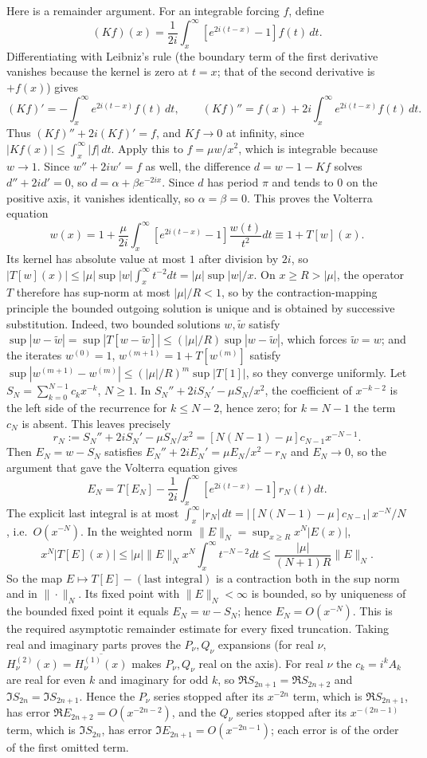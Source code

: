 Here is a remainder argument. For an integrable forcing $f$, define
\[
(Kf)(x)=\frac1{2i}\int_x^\infty[e^{2i(t-x)}-1]f(t)\,dt.
\]
Differentiating with Leibniz's rule (the boundary term of the first
derivative vanishes because the kernel is zero at $t=x$; that of the
second derivative is $+f(x)$) gives
\[
(Kf)'=-\int_x^\infty e^{2i(t-x)}f(t)\,dt,\qquad
(Kf)''=f(x)+2i\int_x^\infty e^{2i(t-x)}f(t)\,dt.
\]
Thus $(Kf)''+2i(Kf)'=f$, and $Kf\to0$ at infinity, since
$|Kf(x)|\le\int_x^\infty|f|\,dt$.
Apply this to $f=\mu w/x^2$, which is integrable because $w\to1$.
Since $w''+2iw'=f$ as well, the difference $d=w-1-Kf$ solves
$d''+2id'=0$, so $d=\alpha+\beta e^{-2ix}$.
Since $d$ has period $\pi$ and tends to $0$ on the positive axis, it
vanishes identically, so $\alpha=\beta=0$.
This proves the Volterra equation
\[
w(x)=1+\frac\mu{2i}\int_x^\infty
 [e^{2i(t-x)}-1]\frac{w(t)}{t^2}dt\equiv1+T[w](x).
\]
Its kernel has absolute value at most $1$ after division by $2i$, so
$|T[w](x)|\le|\mu|\sup|w|\int_x^\infty t^{-2}dt=|\mu|\sup|w|/x$.
On $x\ge R>|\mu|$, the operator $T$ therefore has sup-norm at most
$|\mu|/R<1$, so by the contraction-mapping principle the bounded
outgoing solution is unique and is obtained by successive substitution.
Indeed, two bounded solutions $w,\tilde w$ satisfy
$\sup|w-\tilde w|=\sup|T[w-\tilde w]|\le(|\mu|/R)\sup|w-\tilde w|$,
which forces $\tilde w=w$; and the iterates $w^{(0)}=1$,
$w^{(m+1)}=1+T[w^{(m)}]$ satisfy
$\sup|w^{(m+1)}-w^{(m)}|\le(|\mu|/R)^m\sup|T[1]|$, so they converge
uniformly. Let $S_N=\sum_{k=0}^{N-1}c_kx^{-k}$, $N\ge1$.
In $S_N''+2iS_N'-\mu S_N/x^2$, the coefficient of $x^{-k-2}$ is the
left side of the recurrence for $k\le N-2$, hence zero; for $k=N-1$
the term $c_N$ is absent. This leaves precisely
\[
r_N:=S_N''+2iS_N'-\mu S_N/x^2
=[N(N-1)-\mu]c_{N-1}x^{-N-1}.
\]
Then $E_N=w-S_N$ satisfies $E_N''+2iE_N'=\mu E_N/x^2-r_N$ and
$E_N\to0$, so the argument that gave the Volterra equation gives
\[
E_N=T[E_N]-\frac1{2i}\int_x^\infty[e^{2i(t-x)}-1]r_N(t)dt.
\]
The explicit last integral is at most
$\int_x^\infty|r_N|\,dt=|[N(N-1)-\mu]c_{N-1}|\,x^{-N}/N$, i.e.\
$O(x^{-N})$. In the weighted norm
$\|E\|_N=\sup_{x\ge R}x^N|E(x)|$,
\[
x^N|T[E](x)|
\le |\mu|\|E\|_Nx^N\int_x^\infty t^{-N-2}dt
\le\frac{|\mu|}{(N+1)R}\|E\|_N.
\]
So the map $E\mapsto T[E]-(\text{last integral})$ is a contraction
both in the sup norm and in $\|\cdot\|_N$. Its fixed point with
$\|E\|_N<\infty$ is bounded, so by uniqueness of the bounded fixed point
it equals $E_N=w-S_N$; hence $E_N=O(x^{-N})$. This is the required
asymptotic remainder estimate for every fixed truncation. Taking real
and imaginary parts proves the $P_\nu,Q_\nu$ expansions (for real $\nu$,
$H^{(2)}_\nu(x)=\overline{H^{(1)}_\nu(x)}$ makes $P_\nu,Q_\nu$ real on
the axis). For real $\nu$ the $c_k=i^kA_k$ are real for even $k$ and
imaginary for odd $k$, so $\Re S_{2n+1}=\Re S_{2n+2}$ and
$\Im S_{2n}=\Im S_{2n+1}$. Hence the $P_\nu$ series stopped after its
$x^{-2n}$ term, which is $\Re S_{2n+1}$, has error
$\Re E_{2n+2}=O(x^{-2n-2})$, and the $Q_\nu$ series stopped after its
$x^{-(2n-1)}$ term, which is $\Im S_{2n}$, has error
$\Im E_{2n+1}=O(x^{-2n-1})$; each error is of the order of the first
omitted term.

